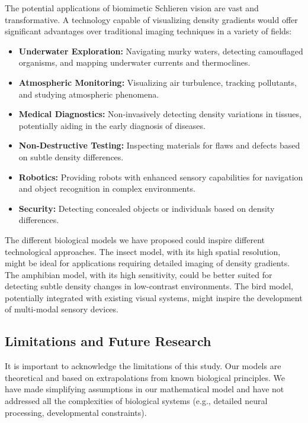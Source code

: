 \documentclass[11pt]{article}
\begin{document}
The potential applications of biomimetic Schlieren vision are vast and transformative. A technology capable of visualizing density gradients would offer significant advantages over traditional imaging techniques in a variety of fields:
\begin{itemize}
    \item \textbf{Underwater Exploration:} Navigating murky waters, detecting camouflaged organisms, and mapping underwater currents and thermoclines.
    \item \textbf{Atmospheric Monitoring:} Visualizing air turbulence, tracking pollutants, and studying atmospheric phenomena.
    \item \textbf{Medical Diagnostics:} Non-invasively detecting density variations in tissues, potentially aiding in the early diagnosis of diseases.
    \item \textbf{Non-Destructive Testing:} Inspecting materials for flaws and defects based on subtle density differences.
    \item \textbf{Robotics:} Providing robots with enhanced sensory capabilities for navigation and object recognition in complex environments.
    \item \textbf{Security:} Detecting concealed objects or individuals based on density differences.
\end{itemize}
The different biological models we have proposed could inspire different technological approaches. The insect model, with its high spatial resolution, might be ideal for applications requiring detailed imaging of density gradients. The amphibian model, with its high sensitivity, could be better suited for detecting subtle density changes in low-contrast environments. The bird model, potentially integrated with existing visual systems, might inspire the development of multi-modal sensory devices.

\subsection{Limitations and Future Research}

It is important to acknowledge the limitations of this study. Our models are theoretical and based on extrapolations from known biological principles. We have made simplifying assumptions in our mathematical model and have not addressed all the complexities of biological systems (e.g., detailed neural processing, developmental constraints).
\end{document}

